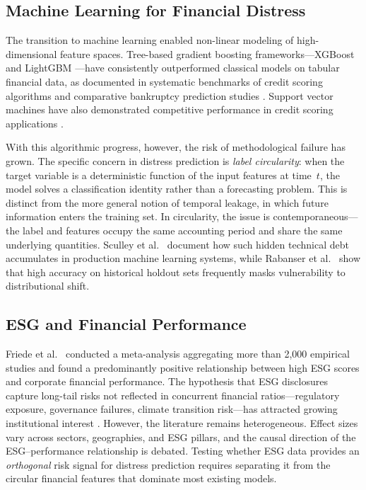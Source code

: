 \documentclass[sigconf,anonymous]{acmart}
\begin{document}
\subsection{Machine Learning for Financial Distress}
The transition to machine learning enabled non-linear modeling of high-dimensional feature spaces. Tree-based gradient boosting frameworks---XGBoost \cite{chen2016} and LightGBM \cite{ke2017}---have consistently outperformed classical models on tabular financial data, as documented in systematic benchmarks of credit scoring algorithms \cite{lessmann2015} and comparative bankruptcy prediction studies \cite{barboza2017}. Support vector machines have also demonstrated competitive performance in credit scoring applications \cite{bellotti2009}.

With this algorithmic progress, however, the risk of methodological failure has grown. The specific concern in distress prediction is \textit{label circularity}: when the target variable is a deterministic function of the input features at time~$t$, the model solves a classification identity rather than a forecasting problem. This is distinct from the more general notion of temporal leakage, in which future information enters the training set. In circularity, the issue is contemporaneous---the label and features occupy the same accounting period and share the same underlying quantities. Sculley et al.\ \cite{sculley2015} document how such hidden technical debt accumulates in production machine learning systems, while Rabanser et al.\ \cite{rabanser2019} show that high accuracy on historical holdout sets frequently masks vulnerability to distributional shift.

\subsection{ESG and Financial Performance}
Friede et al.\ \cite{friede2015} conducted a meta-analysis aggregating more than 2,000 empirical studies and found a predominantly positive relationship between high ESG scores and corporate financial performance. The hypothesis that ESG disclosures capture long-tail risks not reflected in concurrent financial ratios---regulatory exposure, governance failures, climate transition risk---has attracted growing institutional interest \cite{bassen2006}. However, the literature remains heterogeneous. Effect sizes vary across sectors, geographies, and ESG pillars, and the causal direction of the ESG--performance relationship is debated. Testing whether ESG data provides an \textit{orthogonal} risk signal for distress prediction requires separating it from the circular financial features that dominate most existing models.
\end{document}
